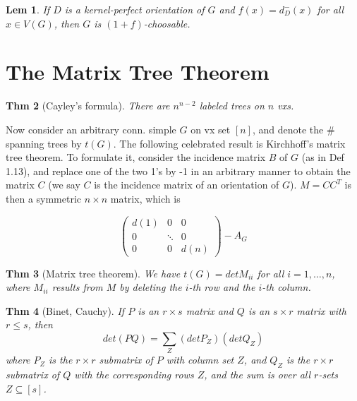 \documentclass[11pt, fleqn, a4paper, landscape]{article}
\theoremstyle{plain} %
\newtheorem{thm}{Thm}
\newtheorem{lem}[thm]{Lem}
\theoremstyle{remark} %
\theoremstyle{definition} %
\begin{document}
\begin{multicols}{5}
\begin{lem}
If $D$ is a kernel-perfect orientation of $G$ and $f(x) = d^-_D(x)$ for all $x \in V (G)$, then $G$ is $(1 + f)$-choosable.
\end{lem}

\section{The Matrix Tree Theorem}

\begin{thm}[Cayley's formula]
There are $n^{n-2}$ labeled trees on $n$ vxs.
\end{thm}

Now consider an arbitrary conn. simple $G$ on vx set $[n]$, and denote the \# spanning trees by $t(G)$. The following celebrated result is Kirchhoff’s matrix tree theorem. To formulate it, consider the incidence matrix $B$ of $G$ (as in Def 1.13), and replace one of the
two 1’s by -1 in an arbitrary manner to obtain the matrix $C$ (we say $C$ is the incidence matrix of an orientation of $G$). $ M = CC^T$ is then a symmetric $n \times n$ matrix, which is 

\[
\begin{pmatrix}
d(1) & 0 & 0  \\
0 & \ddots & 0  \\
0 & 0 & d(n)  
\end{pmatrix}-A_G\]

\begin{thm}[Matrix tree theorem]
We have $t(G) = det M_{ii}$ for all $i = 1, \dots , n$, where $M_{ii}$ results
from $M$ by deleting the $i$-th row and the $i$-th column.
\end{thm}

\begin{thm}[Binet,  Cauchy]
If $P$ is an $r \times s$ matrix and $Q$ is an $s \times r$ matrix with $r\le s$, then \[det(PQ) =\sum_Z (det P_Z)(detQ_Z)\]
where $P_Z$ is the $r\times r$ submatrix of $P$ with column set $Z$, and $Q_Z$ is the $r\times r$ submatrix of $Q$ with the corresponding rows $Z$, and the sum is over all $r$-sets $Z \subseteq [s]$.
\end{thm}

\addtocounter{subsection}{1}


\end{multicols}
\end{document}

